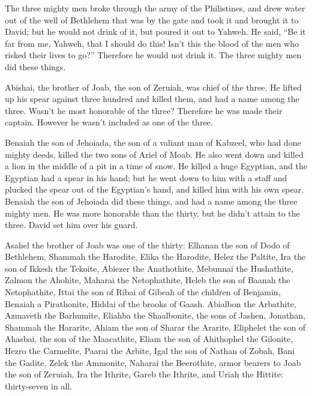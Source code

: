  The three mighty men broke through the army of the
Philistines, and drew water out of the well of Bethlehem that was by the
gate and took it and brought it to David; but he would not drink of it,
but poured it out to Yahweh.  He said, ``Be it far from me,
Yahweh, that I should do this! Isn't this the blood of the men who
risked their lives to go?'' Therefore he would not drink it. The three
mighty men did these things.

 Abishai, the brother of Joab, the son of Zeruiah, was
chief of the three. He lifted up his spear against three hundred and
killed them, and had a name among the three.  Wasn't he
most honorable of the three? Therefore he was made their captain.
However he wasn't included as one of the three.

 Benaiah the son of Jehoiada, the son of a valiant man of
Kabzeel, who had done mighty deeds, killed the two sons of Ariel of
Moab. He also went down and killed a lion in the middle of a pit in a
time of snow.  He killed a huge Egyptian, and the Egyptian
had a spear in his hand; but he went down to him with a staff and
plucked the spear out of the Egyptian's hand, and killed him with his
own spear.  Benaiah the son of Jehoiada did these things,
and had a name among the three mighty men.  He was more
honorable than the thirty, but he didn't attain to the three. David set
him over his guard.

 Asahel the brother of Joab was one of the thirty: Elhanan
the son of Dodo of Bethlehem,  Shammah the Harodite, Elika
the Harodite,  Helez the Paltite, Ira the son of Ikkesh the
Tekoite,  Abiezer the Anathothite, Mebunnai the Hushathite,
 Zalmon the Ahohite, Maharai the Netophathite,
 Heleb the son of Baanah the Netophathite, Ittai the son of
Ribai of Gibeah of the children of Benjamin,  Benaiah a
Pirathonite, Hiddai of the brooks of Gaash.  Abialbon the
Arbathite, Azmaveth the Barhumite,  Eliahba the
Shaalbonite, the sons of Jashen, Jonathan,  Shammah the
Hararite, Ahiam the son of Sharar the Ararite,  Eliphelet
the son of Ahasbai, the son of the Maacathite, Eliam the son of
Ahithophel the Gilonite,  Hezro the Carmelite, Paarai the
Arbite,  Igal the son of Nathan of Zobah, Bani the Gadite,
 Zelek the Ammonite, Naharai the Beerothite, armor bearers
to Joab the son of Zeruiah,  Ira the Ithrite, Gareb the
Ithrite,  and Uriah the Hittite: thirty-seven in all.


